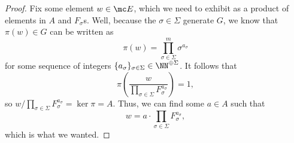 \begin{proof}
	Fix some element $w\in\mc E$, which we need to exhibit as a product of elements in $A$ and $F_\sigma$s. Well, because the $\sigma\in\Sigma$ generate $ G$, we know that $\pi(w)\in G$ can be written as
	\[\pi(w)=\prod_{\sigma\in\Sigma}^m\sigma^{a_\sigma}\]
	for some sequence of integers $\{a_\sigma\}_{\sigma\in\Sigma}\in\NN^{\oplus\Sigma}$. It follows that
	\[\pi\left(\frac w{\prod_{\sigma\in\Sigma}F_\sigma^{a_\sigma}}\right)=1,\]
	so $w/\prod_{\sigma\in\Sigma}F_\sigma^{a_\sigma}=\ker\pi=A$. Thus, we can find some $a\in A$ such that
	\[w=a\cdot\prod_{\sigma\in\Sigma}F_\sigma^{a_\sigma},\]
	which is what we wanted.
\end{proof}